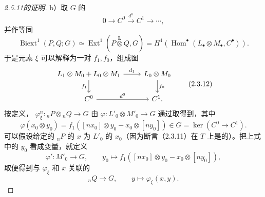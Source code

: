 \begin{proof}[2.5.11的证明]
 b）取 $G$ 的
\[0\longrightarrow C^0\xrightarrow{d^0}C^1\longrightarrow\cdots,\]
并作等同
\[\operatorname{Biext}^1(P,Q;G)\simeq\operatorname{Ext}^1(P\mathbin{\overset{\mathbf L}{\otimes}}Q,G)
=H^1(\operatorname{Hom}^\bullet(L_\bullet\otimes M_\bullet,C^\bullet)).\]
于是元素 $\xi$ 可以解释为一对 $f_1,f_0$，组成图
\[\begin{tikzcd}
L_1\otimes M_0+L_0\otimes M_1\arrow[r,"d_1"]\arrow[d,"f_1"']&L_0\otimes M_0\arrow[d,"f_0"]\\
C^0\arrow[r,"d^0"]&C^1.
\end{tikzcd}\tag{2.3.12}\]
按定义， $\varphi_\xi^n:{}_nP\otimes{}_nQ\longrightarrow G$ 由 $\varphi:L'_0\otimes M'_0\longrightarrow G$ 通过取得到，其中
\[\varphi(x_0\otimes y_0)=f_1([nx_0]\otimes y_0-x_0\otimes[ny_0])\in G=\ker(C^0\longrightarrow C^1).\tag{2.3.13}\]
可以假设给定的 ${}_nP$ 的 $x$ 为 $L'_0$ 的 $x_0$（因为断言（2.3.11）在 $T$ 上是的）。把上式中的 $y_0$ 看成变量，就定义
\[\varphi':M'_0\longrightarrow G,\qquad
y_0\longmapsto f_1([nx_0]\otimes y_0-x_0\otimes[ny_0]),\tag{2.3.14}\]
取便得到与 $\varphi_\xi$ 和 $x$ 关联的
\[{}_nQ\longrightarrow G,\qquad y\longmapsto\varphi_\xi(x,y).\]


\end{proof}
